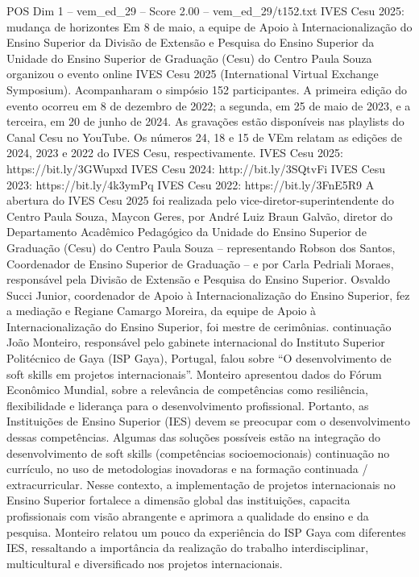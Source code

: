\begin{textsample}{POS Dim 1 – vem\_ed\_29 – Score 2.00 – vem\_ed\_29/t152.txt}  \label{ex:f1_pos_007}
IVES Cesu 2025: mudança de horizontes Em 8 de maio, a equipe de Apoio à Internacionalização do Ensino Superior da Divisão de Extensão e Pesquisa do Ensino Superior da Unidade do Ensino Superior de Graduação (Cesu) do Centro Paula Souza organizou o evento online IVES Cesu 2025 (International Virtual Exchange Symposium).
Acompanharam o simpósio 152 participantes.
A primeira edição do evento ocorreu em 8 de dezembro de 2022; a segunda, em 25 de maio de 2023, e a terceira, em 20 de junho de 2024.
As gravações estão disponíveis nas playlists do Canal Cesu no YouTube.
Os números 24, 18 e 15 de VEm relatam as edições de 2024, 2023 e 2022 do IVES Cesu, respectivamente.
IVES Cesu 2025: https://bit.ly/3GWupxd IVES Cesu 2024: http://bit.ly/3SQtvFi IVES Cesu 2023: https://bit.ly/4k3ymPq IVES Cesu 2022: https://bit.ly/3FnE5R9 A abertura do IVES Cesu 2025 foi realizada pelo vice-diretor-superintendente do Centro Paula Souza, Maycon Geres, por André Luiz Braun Galvão, diretor do Departamento Acadêmico Pedagógico da Unidade do Ensino Superior de Graduação (Cesu) do Centro Paula Souza – representando Robson dos Santos, Coordenador de Ensino Superior de Graduação – e por Carla Pedriali Moraes, responsável pela Divisão de Extensão e Pesquisa do Ensino Superior.
Osvaldo Succi Junior, coordenador de Apoio à Internacionalização do Ensino Superior, fez a mediação e Regiane Camargo Moreira, da equipe de Apoio à Internacionalização do Ensino Superior, foi mestre de cerimônias. continuação João Monteiro, responsável pelo gabinete internacional do Instituto Superior Politécnico de Gaya (ISP Gaya), Portugal, falou sobre “O desenvolvimento de soft skills em projetos internacionais”.
Monteiro apresentou dados do Fórum Econômico Mundial, sobre a relevância de competências como resiliência, flexibilidade e liderança para o desenvolvimento profissional.
Portanto, as Instituições de Ensino Superior (IES) devem se preocupar com o desenvolvimento dessas competências.
Algumas das soluções possíveis estão na integração do desenvolvimento de soft skills (competências socioemocionais) continuação no currículo, no uso de metodologias inovadoras e na formação continuada / extracurricular.
Nesse contexto, a implementação de projetos internacionais no Ensino Superior fortalece a dimensão global das instituições, capacita profissionais com visão abrangente e aprimora a qualidade do ensino e da pesquisa.
Monteiro relatou um pouco da experiência do ISP Gaya com diferentes IES, ressaltando a importância da realização do trabalho interdisciplinar, multicultural e diversificado nos projetos internacionais.

\end{textsample}
